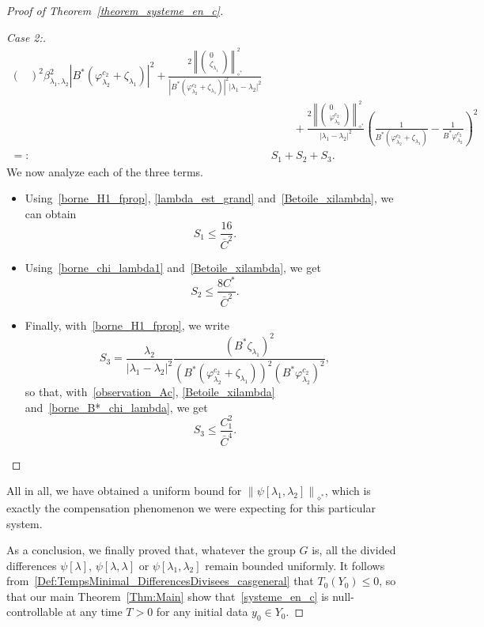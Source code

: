 \documentclass[11pt]{article}
\theoremstyle{definition}
\numberwithin{equation}{section}
\numberwithin{figure}{section}
\numberwithin{table}{section}
\newenvironment{step}[1]{\begin{proof}[#1]}{\let\qed\relax\end{proof}}
\newcommand{\fprop}[2]{\varphi^{#1}_{#2}}
\newcommand{\Fzp}{Y_0}
\newcommand{\normeXalphas}[1]{\left\| #1 \right\|_{\diamond^*}}
\begin{document}
\begin{proof}[Proof of Theorem~\ref{theorem_systeme_en_c}]
\begin{step}{Case 2:}
\begin{align*}
{{\begin{pmatrix}
\end{pmatrix}}^2}{\beta_{\lambda_1,\lambda_2}^2|B^*(\fprop{c_2}{\lambda_2} + \zeta_{\lambda_1})|^2}
+ \frac{2\normeXalphas{
\begin{pmatrix} 0 \\ \zeta_{\lambda_1}
\end{pmatrix}}^2 }{|B^*\left(\fprop{c_2}{\lambda_2} + \zeta_{\lambda_1}\right)|^2 |\lambda_1-\lambda_2|^2}\\
&
\quad\quad + \frac{2\normeXalphas{
\begin{pmatrix} 0 \\ \fprop{c_2}{\lambda_2}
\end{pmatrix}}^2}{|\lambda_1-\lambda_2|^2} \left(\frac{1}{B^*\left(\fprop{c_2}{\lambda_2}+\zeta_{\lambda_1}\right)} - \frac{1}{B^*\fprop{c_2}{\lambda_2}}\right)^2\\
=: & S_1 + S_2 + S_3.
\end{align*}
We now analyze each of the three terms.
\begin{itemize}
\item Using~\eqref{borne_H1_fprop}, \eqref{lambda_est_grand} and~\eqref{Betoile_xilambda}, we can obtain
\[
S_1\leq \frac{16}{\bar{C}^2}.
\]
\item Using~\eqref{borne_chi_lambda1} and~\eqref{Betoile_xilambda}, we get
\[
S_2 \leq \frac{8 C^*}{\bar{C}^2}.
\]
\item Finally, with~\eqref{borne_H1_fprop}, we write
\[
S_3 = \frac{\lambda_2}{|\lambda_1-\lambda_2|^2}\frac{(B^* \zeta_{\lambda_1})^2}{\left(B^*\left(\fprop{c_2}{\lambda_2}+\zeta_{\lambda_1}\right)\right)^2 \left(B^*\fprop{c_2}{\lambda_2}\right)^2},
\]
so that, with~\eqref{observation_Ac}, \eqref{Betoile_xilambda} and~\eqref{borne_B*_chi_lambda}, we get
\[
S_3\leq \frac{C_1^2}{\bar{C}^4}.
\]
\end{itemize}
\end{step}
All in all, we have obtained a uniform bound for $\normeXalphas{\psi[\lambda_1,\lambda_2]}$, which is exactly the compensation phenomenon we were expecting for this particular system.



As a conclusion, we finally proved that, whatever the group $G$ is, all the divided differences $\psi[\lambda]$, $\psi[\lambda,\lambda]$ or $\psi[\lambda_1,\lambda_2]$ remain bounded uniformly. It follows from~\eqref{Def:TempsMinimal_DifferencesDivisees_casgeneral} that $T_0(\Fzp)\leq 0$, so that our main Theorem~\ref{Thm:Main} show that~\eqref{systeme_en_c} is null-controllable at any time $T>0$ for any initial data $y_0\in \Fzp$.
\end{proof}
\end{document}
